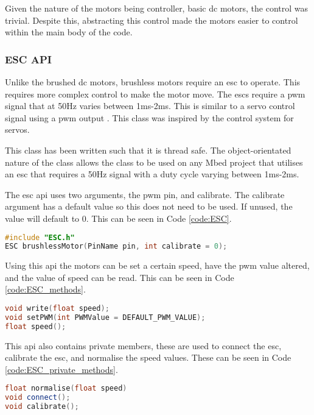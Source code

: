 \documentclass [12pt]{article}
\begin{document}
Given the nature of the motors being controller, basic \gls{dc} motors, the control was trivial. Despite this, abstracting this control made the motors easier to control within the main body of the code. 

\subsubsection{ESC API}

Unlike the brushed \gls{dc} motors, brushless motors require an \gls{esc} to operate. This requires more complex control to make the motor move. The \gls{esc}s require a \gls{pwm} signal that at 50Hz varies between 1ms-2ms. This is similar to a servo control signal using a \gls{pwm} output \cite{PWM_control_of_an_ESC}. This class was inspired by the control system for servos. 

This class has been written such that it is thread safe. The object-orientated nature of the class allows the class to be used on any Mbed project that utilises an \gls{esc} that requires a 50Hz signal with a duty cycle varying between 1ms-2ms. 

The \gls{esc} \gls{api} uses  two arguments, the \gls{pwm} pin, and calibrate. The calibrate argument has a default value so this does not need to be used. If unused, the value will default to 0. This can be seen in Code \ref{code:ESC}.

\begin{lstlisting}[language=C++,label=code:ESC,caption=ESC Class Constructor]
#include "ESC.h"
ESC brushlessMotor(PinName pin, int calibrate = 0);
\end{lstlisting}

Using this \gls{api} the motors can be set a certain speed, have the \gls{pwm} value altered, and the value of speed can be read. This can be seen in Code \ref{code:ESC_methods}.

\begin{lstlisting}[language=C++,label=code:ESC_methods,caption=ESC Class Public Methods]
void write(float speed);
void setPWM(int PWMValue = DEFAULT_PWM_VALUE);
float speed();
\end{lstlisting}

This \gls{api} also contains private members, these are used to connect the \gls{esc}, calibrate the \gls{esc}, and normalise the speed values. These can be seen in Code \ref{code:ESC_private_methods}.

\begin{lstlisting}[language=C++,label=code:ESC_private_methods,caption=ESC Class Private Methods]
float normalise(float speed)
void connect();
void calibrate();
\end{lstlisting}
\end{document}
